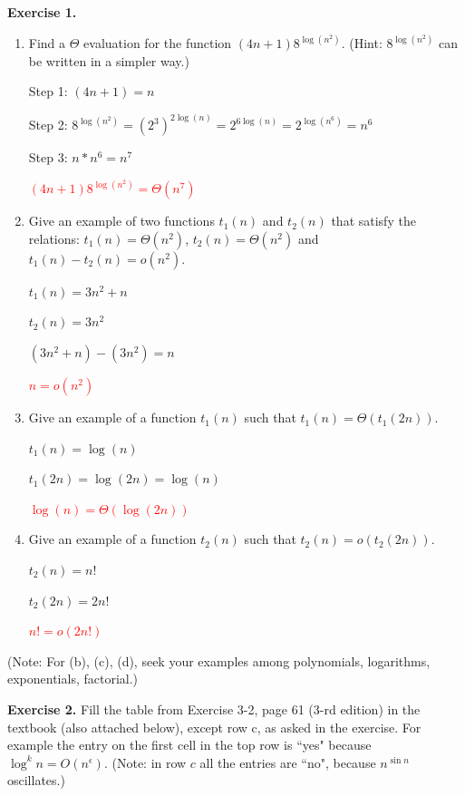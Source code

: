 \documentclass[11pt]{article}
\begin{document}
\textbf{Exercise 1.}
\begin{enumerate}[label=\alph*]
\item   Find a $\Theta$ evaluation for the function $(4n + 1) 8^{\log(n^2)}$. (Hint:  $8^{\log(n^2)}$ can be written in a simpler way.)

\medskip Step 1: $(4n + 1) = n$

\medskip Step 2: $8^{\log(n^2)} = (2^3)^{2\log(n)} = 2^{6\log(n)} = 2^{\log(n^6)} = n^6$

\medskip Step 3: $n * n^6 = n^7$

\medskip\textcolor{red}{ {$(4n + 1) 8^{\log(n^2)} = \Theta(n^7)$} }


\item  Give an example of two functions $t_1(n)$ and $t_2(n)$ that satisfy the relations:   $t_1(n) = \Theta(n^2)$, $t_2(n) = \Theta(n^2)$ and $t_1(n) - t_2(n) = o(n^2)$.

\bigskip $t_1(n) = 3n^2 + n$

$t_2(n) = 3n^2$

$(3n^2 + n) - (3n^2) = n$

\textcolor{red}{$n = o(n^2)$}

\item  Give an example of a function $t_1(n)$ such that $t_1(n) = \Theta(t_1(2n))$.

\medskip $t_1(n) = \log(n)$

$t_1(2n) = \log(2n) = \log(n)$

\smallskip\textcolor{red}{$\log(n) = \Theta(\log(2n))$} 

\item   Give an example of a function $t_2(n)$ such that $t_2(n) = o(t_2(2n))$.

$t_2(n) = n!$

$t_2(2n) = 2n!$ 

\textcolor{red}{\smallskip $n! = o(2n!)$}
 
\end{enumerate}

(Note: For (b), (c), (d), seek your examples among polynomials, logarithms, exponentials, factorial.)
\bigskip

\textbf{Exercise 2.}   Fill the table   from Exercise 3-2, page  61 (3-rd edition)  in the textbook (also attached below), except row c, as asked in the exercise.  For example the entry on the first cell in the top row is ``yes" because $\log^k n = O(n^\epsilon)$.  (Note: in row $c$ all the entries are ``no", because $n^{\sin n}$ oscillates.)
\bigskip
\end{document}

